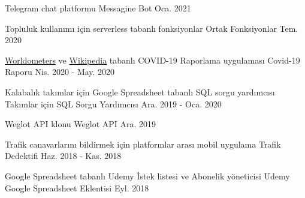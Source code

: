 

\begin{cventries}

  \cventry
    {Telegram chat platformu} %
    {Messagine Bot} %
    {} %
    {Oca. 2021} %
    {}

  \cventry
    {Topluluk kullanımı için serverless tabanlı fonksiyonlar} %
    {Ortak Fonksiyonlar} %
    {} %
    {Tem. 2020} %
    {}

  \cventry
    {\href{https://www.worldometers.info/coronavirus}{Worldometers} ve \href{https://en.wikipedia.org/wiki/COVID-19_pandemic}{Wikipedia} tabanlı COVID-19 Raporlama uygulaması} %
    {Covid-19 Raporu} %
    {} %
    {Nis. 2020 - May. 2020} %
    {}

  \cventry
    {Kalabalık takımlar için Google Spreadsheet tabanlı SQL sorgu yardımcısı} %
    {Takımlar için SQL Sorgu Yardımcısı} %
    {} %
    {Ara. 2019 - Oca. 2020} %
    {}

  \cventry
    {Weglot API klonu} %
    {Weglot API} %
    {} %
    {Ara. 2019} %
    {}

  \cventry
    {Trafik canavarlarını bildirmek için platformlar arası mobil uygulama} %
    {Trafik Dedektifi} %
    {} %
    {Haz. 2018 - Kas. 2018} %
    {}

  \cventry
    {Google Spreadsheet tabanlı Udemy İstek listesi ve Abonelik yöneticisi} %
    {Udemy Google Spreadsheet Eklentisi} %
    {} %
    {Eyl. 2018} %
    {}


\end{cventries}
